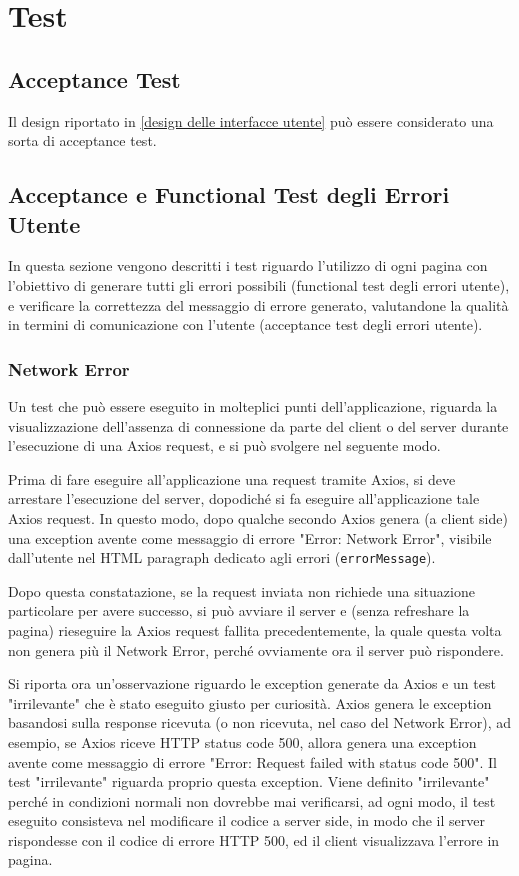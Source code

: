 \section{Test}

\subsection{Acceptance Test}

Il design riportato in \ref{design delle interfacce utente} può essere considerato una sorta di acceptance test.

\subsection{Acceptance e Functional Test degli Errori Utente}

In questa sezione vengono descritti i test riguardo l'utilizzo di ogni pagina con l'obiettivo di generare tutti gli errori possibili (functional test degli errori utente), e verificare la correttezza del messaggio di errore generato, valutandone la qualità in termini di comunicazione con l'utente (acceptance test degli errori utente).

\subsubsection{Network Error}

Un test che può essere eseguito in molteplici punti dell'applicazione, riguarda la visualizzazione dell'assenza di connessione da parte del client o del server durante l'esecuzione di una Axios request, e si può svolgere nel seguente modo.

Prima di fare eseguire all'applicazione una request tramite Axios, si deve arrestare l'esecuzione del server, dopodiché si fa eseguire all'applicazione tale Axios request. In questo modo, dopo qualche secondo Axios genera (a client side) una exception avente come messaggio di errore "Error: Network Error", visibile dall'utente nel HTML paragraph dedicato agli errori (\texttt{errorMessage}).

Dopo questa constatazione, se la request inviata non richiede una situazione particolare per avere successo, si può avviare il server e (senza refreshare la pagina) rieseguire la Axios request fallita precedentemente, la quale questa volta non genera più il Network Error, perché ovviamente ora il server può rispondere.

Si riporta ora un'osservazione riguardo le exception generate da Axios e un test "irrilevante" che è stato eseguito giusto per curiosità. Axios genera le exception basandosi sulla response ricevuta (o non ricevuta, nel caso del Network Error), ad esempio, se Axios riceve HTTP status code 500, allora genera una exception avente come messaggio di errore "Error: Request failed with status code 500". Il test "irrilevante" riguarda proprio questa exception. Viene definito "irrilevante" perché in condizioni normali non dovrebbe mai verificarsi, ad ogni modo, il test eseguito consisteva nel modificare il codice a server side, in modo che il server rispondesse con il codice di errore HTTP 500, ed il client visualizzava l'errore in pagina.

